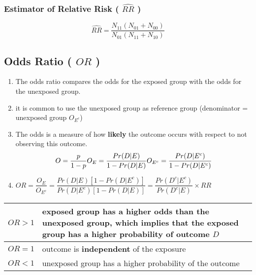 \subsubsection{Estimator of Relative Risk ( $\hat{RR}$ ) \cite{ism-1}}\label{Estimator of Relative Risk}

\[
    \hat{RR}
    = \dfrac{N_{11}(N_{01} + N_{00})}{N_{01}(N_{11} + N_{10})}
\]



\subsection{Odds Ratio ( $OR$ ) \cite{ism-1}} \label{Odds Ratio}

\begin{enumerate}[itemsep=0.2cm]
    \item The odds ratio compares the odds for the exposed group with the odds for the unexposed group.

    \item it is common to use the unexposed group as reference group (denominator = unexposed group $O_{E^c}$)

    \item The odds is a measure of how \textbf{likely} the outcome occurs with respect to not observing this outcome.
    \[
        \hfill
        O = \dfrac{p}{1-p}
        \hfill
        O_E = \dfrac{Pr (D|E)}{1 - Pr (D|E)}
        \hfill
        O_{E^c} = \dfrac{Pr (D|E^c)}{1 - Pr (D|E^c)}
        \hfill
    \]

    \item $
        OR 
        = \dfrac{O_E}{O_{E^c}}
        = \dfrac{Pr (D|E)[1 - Pr (D|E^c)]}{Pr (D|E^c)[1 - Pr (D|E)]}
        = \dfrac{Pr (D^c|E^c)}{Pr (D^c|E)} \times RR
    $

\end{enumerate}

\begin{customTableWrapper}{1.5}
\begin{table}[H]
    \centering
    \begin{tabular}{|l|p{11cm}|}
        \hline

        $OR > 1$ & exposed group has a higher odds than the unexposed group, which implies that the exposed group has a higher probability of outcome $D$ \\
        \hline

        $OR = 1$ & outcome is \textbf{independent} of the exposure \\
        \hline

        $OR < 1$ & unexposed group has a higher probability of the outcome \\
        \hline

    \end{tabular}
\end{table}
\end{customTableWrapper}

